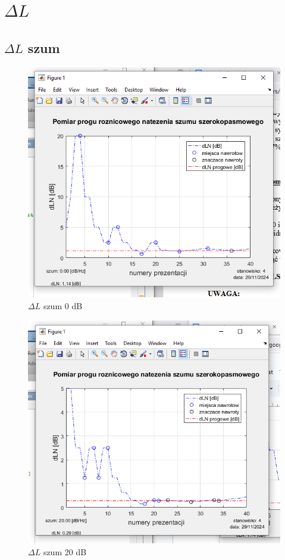 \documentclass[12pt]{article}
\begin{document}
\section{$\Delta L$}
\subsection{$\Delta L$ szum}
\begin{figure}[H]
    \centering
    \includegraphics[width=\textwidth]{szum_0.png}
    \caption{$\Delta L$ szum 0 dB}
\end{figure}
\begin{figure}[H]
    \centering
    \includegraphics[width=\textwidth]{szum_20.png}
    \caption{$\Delta L$ szum 20 dB}
\end{figure}
\end{document}
